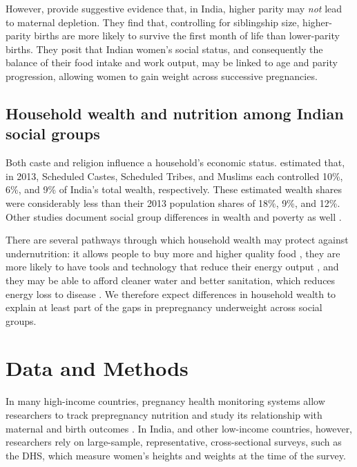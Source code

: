 \documentclass[12pt]{article}
\begin{document}
However, \cite{coffey2021neonatal} provide suggestive evidence that, in India, higher parity may \emph{not} lead to maternal depletion.  They find that, controlling for siblingship size, higher-parity births are more likely to survive the first month of life than lower-parity births.  They posit that Indian women's social status, and consequently the balance of their food intake and work output, may be linked to age and parity progression, allowing women to gain weight across successive pregnancies. 

\subsection{Household wealth and nutrition among Indian social groups}

Both caste and religion influence a household's economic status.  \cite{tagade2020intergroup} estimated that, in 2013, Scheduled Castes, Scheduled Tribes, and Muslims each controlled 10\%, 6\%, and 9\% of India's total wealth, respectively.  These estimated wealth shares were considerably less than their 2013 population shares of 18\%, 9\%, and 12\%.  Other studies document social group differences in wealth and poverty as well \citep{thorat2017escaping}. 

There are several pathways through which household wealth may protect against undernutrition: it allows people to buy more and higher quality food \citep{raghunathan2021affordability}, they are more likely to have tools and technology that reduce their energy output \citep{deaton2009food}, and they may be able to afford cleaner water and better sanitation, which reduces energy loss to disease \citep{bhutta2008works}.  We therefore expect differences in household wealth to explain at least part of the gaps in prepregnancy underweight across social groups. 

\section{Data and Methods}
 
 In many high-income countries, pregnancy health monitoring systems allow researchers to track prepregnancy nutrition and study its relationship with maternal and birth outcomes \citep{cornish2024maternal}.  In India, and other low-income countries, however, researchers rely on large-sample, representative, cross-sectional surveys, such as the DHS, which measure women's heights and weights at the time of the survey.  
\end{document}
